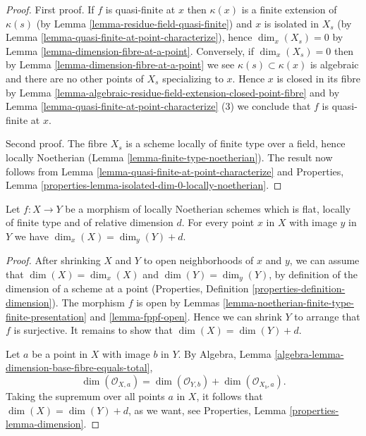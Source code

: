 \begin{proof}
First proof.
If $f$ is quasi-finite at $x$ then $\kappa(x)$ is a finite extension of
$\kappa(s)$ (by
Lemma \ref{lemma-residue-field-quasi-finite})
and $x$ is isolated in $X_s$ (by
Lemma \ref{lemma-quasi-finite-at-point-characterize}),
hence $\dim_x(X_s) = 0$ by
Lemma \ref{lemma-dimension-fibre-at-a-point}.
Conversely, if $\dim_x(X_s) = 0$ then by
Lemma \ref{lemma-dimension-fibre-at-a-point}
we see $\kappa(s) \subset \kappa(x)$ is algebraic and
there are no other points of $X_s$ specializing to $x$.
Hence $x$ is closed in its fibre by
Lemma \ref{lemma-algebraic-residue-field-extension-closed-point-fibre}
and by
Lemma \ref{lemma-quasi-finite-at-point-characterize} (3)
we conclude that $f$ is quasi-finite at $x$.

\medskip\noindent
Second proof. The fibre $X_s$ is a scheme locally of finite type over a field,
hence locally Noetherian (Lemma \ref{lemma-finite-type-noetherian}).
The result now follows from
Lemma \ref{lemma-quasi-finite-at-point-characterize}
and Properties, Lemma \ref{properties-lemma-isolated-dim-0-locally-noetherian}.
\end{proof}

\begin{lemma}
\label{lemma-rel-dimension-dimension}
Let $f : X \to Y$ be a morphism of locally Noetherian schemes
which is flat, locally of finite type and of relative dimension $d$.
For every point $x$ in $X$ with image
$y$ in $Y$ we have $\dim_x(X) = \dim_y(Y) + d$.
\end{lemma}

\begin{proof}
After shrinking $X$ and $Y$ to open neighborhoods of $x$ and $y$,
we can assume that $\dim(X) = \dim_x(X)$ and $\dim(Y) = \dim_y(Y)$,
by definition of the dimension of a scheme at a point
(Properties, Definition \ref{properties-definition-dimension}).
The morphism $f$ is open by Lemmas
\ref{lemma-noetherian-finite-type-finite-presentation} and
\ref{lemma-fppf-open}.
Hence we can shrink $Y$ to arrange that $f$ is surjective.
It remains to show that $\dim(X) = \dim(Y) + d$.

\medskip\noindent
Let $a$ be a point in $X$ with image $b$ in $Y$. By
Algebra, Lemma \ref{algebra-lemma-dimension-base-fibre-equals-total},
$$
\dim(\mathcal{O}_{X,a}) = \dim(\mathcal{O}_{Y,b}) + \dim(\mathcal{O}_{X_b, a}).
$$
Taking the supremum over all points $a$ in $X$, it follows
that $\dim(X) = \dim(Y) + d$, as we want, see
Properties, Lemma \ref{properties-lemma-dimension}.
\end{proof}












